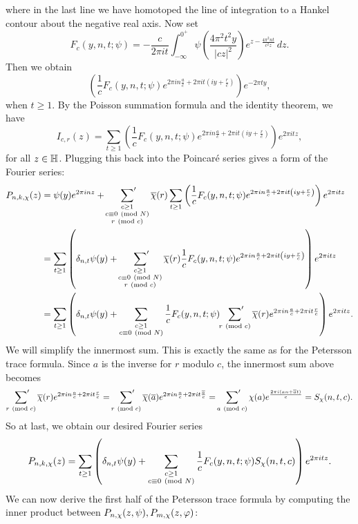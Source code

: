     where in the last line we have homotoped the line of integration to a Hankel contour about the negative real axis. Now set
    \[
      F_{c}(y,n,t;\psi) = -\frac{c}{2\pi it}\int_{-\infty}^{0^{+}}\psi\left(\frac{4\pi^{2}t^{2}y}{|cz|^{2}}\right)e^{z-\frac{4\pi^{2}nt}{c^{2}z}}\,dz.
    \]
    Then we obtain
    \[
      \left(\frac{1}{c}F_{c}(y,n,t;\psi)e^{2\pi in\frac{a}{c}+2\pi it\left(iy+\frac{r}{c}\right)}\right)e^{-2\pi ty},
    \]
    when $t \ge 1$. By the Poisson summation formula and the identity theorem, we have
    \[
      I_{c,r}(z) = \sum_{t \ge 1}\left(\frac{1}{c}F_{c}(y,n,t;\psi)e^{2\pi in\frac{a}{c}+2\pi it\left(iy+\frac{r}{c}\right)}\right)e^{2\pi itz},
    \]
    for all $z \in \mathbb{H}$. Plugging this back into the Poincar\'e series gives a form of the Fourier series:
    \begin{align*}
      P_{n,k,\chi}(z) &= \psi(y)e^{2\pi inz}+\sideset{}{'}\sum_{\substack{c \ge 1 \\ c \equiv 0 \ \left(\text{mod }N\right) \\ r \ \left(\text{mod }c\right)}}\overline{\chi}(r)\sum_{t \ge 1}\left(\frac{1}{c}F_{c}(y,n,t;\psi)e^{2\pi in\frac{a}{c}+2\pi it\left(iy+\frac{r}{c}\right)}\right)e^{2\pi itz} \\
      &= \sum_{t \ge 1}\left(\delta_{n,t}\psi(y)+\sideset{}{'}\sum_{\substack{c \ge 1 \\ c \equiv 0 \ \left(\text{mod }N\right) \\ r \ \left(\text{mod }c\right)}}\overline{\chi}(r)\frac{1}{c}F_{c}(y,n,t;\psi)e^{2\pi in\frac{a}{c}+2\pi it\left(iy+\frac{r}{c}\right)}\right)e^{2\pi itz} \\
      &= \sum_{t \ge 1}\left(\delta_{n,t}\psi(y)+\sum_{\substack{c \ge 1 \\ c \equiv 0 \ \left(\text{mod }N\right)}}\frac{1}{c}F_{c}(y,n,t;\psi)\sideset{}{'}\sum_{r \ \left(\text{mod }c\right)}\overline{\chi}(r)e^{2\pi in\frac{a}{c}+2\pi it\frac{r}{c}}\right)e^{2\pi itz}.
    \end{align*}
    We will simplify the innermost sum. This is exactly the same as for the Petersson trace formula. Since $a$ is the inverse for $r$ modulo $c$, the innermost sum above becomes
    \[
      \sideset{}{'}\sum_{r \ \left(\text{mod }c\right)}\overline{\chi}(r)e^{2\pi in\frac{a}{c}+2\pi it\frac{r}{c}} = \sideset{}{'}\sum_{r \ \left(\text{mod }c\right)}\overline{\chi}(\overline{a})e^{2\pi in\frac{a}{c}+2\pi it\frac{\overline{a}}{c}} = \sideset{}{'}\sum_{a \ \left(\text{mod }c\right)}\chi(a)e^{\frac{2\pi i(an+\overline{a}t)}{c}} = S_{\chi}(n,t,c).
    \]
    So at last, we obtain our desired Fourier series
    \[
      P_{n,k,\chi}(z) = \sum_{t \ge 1}\left(\delta_{n,t}\psi(y)+\sum_{\substack{c \ge 1 \\ c \equiv 0 \ \left(\text{mod }N\right)}}\frac{1}{c}F_{c}(y,n,t;\psi)S_{\chi}(n,t,c)\right)e^{2\pi itz}.
    \]
    We can now derive the first half of the Petersson trace formula by computing the inner product between $P_{n,\chi}(z,\psi),P_{m,\chi}(z,\varphi)$: 
